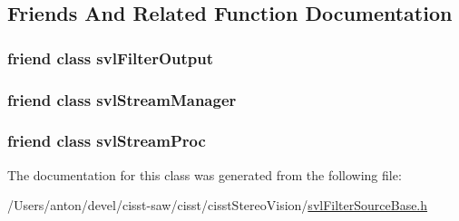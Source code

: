 \subsection{Friends And Related Function Documentation}
\hypertarget{classsvl_filter_source_base_a3f45c3511fc124d190c8ffb5953025f6}{}
\subsubsection[{svl\+Filter\+Output}]{\setlength{\rightskip}{0pt plus 5cm}friend class {\bf svl\+Filter\+Output}\hspace{0.3cm}{\ttfamily [friend]}}\label{classsvl_filter_source_base_a3f45c3511fc124d190c8ffb5953025f6}
\hypertarget{classsvl_filter_source_base_ab5eee58544f2ce644140e932afbe32db}{}
\subsubsection[{svl\+Stream\+Manager}]{\setlength{\rightskip}{0pt plus 5cm}friend class {\bf svl\+Stream\+Manager}\hspace{0.3cm}{\ttfamily [friend]}}\label{classsvl_filter_source_base_ab5eee58544f2ce644140e932afbe32db}
\hypertarget{classsvl_filter_source_base_a6a9ee1dec5ca263793dca09411295245}{}
\subsubsection[{svl\+Stream\+Proc}]{\setlength{\rightskip}{0pt plus 5cm}friend class {\bf svl\+Stream\+Proc}\hspace{0.3cm}{\ttfamily [friend]}}\label{classsvl_filter_source_base_a6a9ee1dec5ca263793dca09411295245}


The documentation for this class was generated from the following file\+:\begin{DoxyCompactItemize}
\item 
/\+Users/anton/devel/cisst-\/saw/cisst/cisst\+Stereo\+Vision/\hyperlink{svl_filter_source_base_8h}{svl\+Filter\+Source\+Base.\+h}\end{DoxyCompactItemize}
